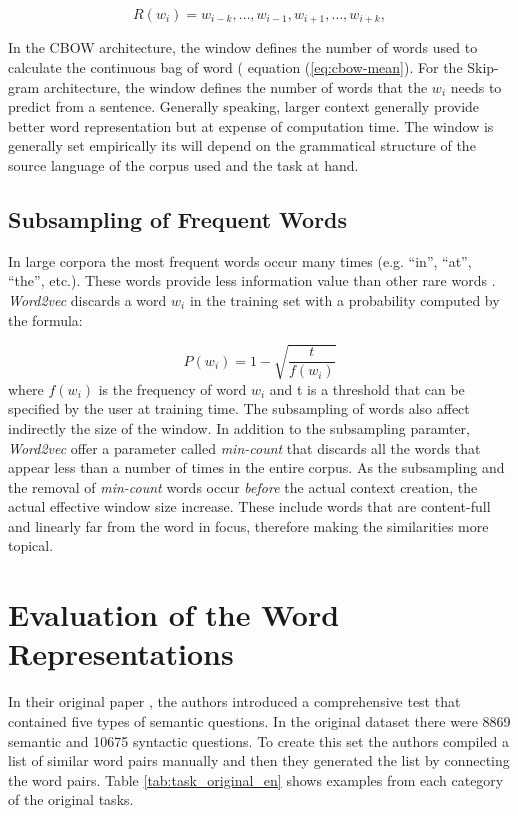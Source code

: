 \begin{equation*}
R(w_i) =
w_{i-k},\ldots,w_{i-1},w_{i+1},\ldots,w_{i+k},
\end{equation*}

In  the \ac{CBOW} architecture, the window defines the number of words used to
calculate the continuous bag of word ( equation (\ref{eq:cbow-mean}).  For
the Skip-gram architecture, the window defines  the number of words that the
$w_i$ needs to predict from a sentence.  Generally speaking,  larger
context generally provide better word representation but at expense of
computation time. The window  is generally set empirically its  will depend
on the grammatical structure of the source language of the corpus used and the task at hand.


\subsection{Subsampling of Frequent Words}
\label{sec:sub-hs}

In large corpora the most frequent words occur many times (e.g.
``in'', ``at'', ``the'', etc.). These words  provide  less information value
than other rare words  \cite{MikolovSCCD13}.  \textit{Word2vec} discards a
word $w_i$ in the training set with a probability computed by the formula:

\begin{equation}
  \label{eq:w2v-subsampling}
  P(w_i)= 1 - \sqrt{\frac{t}{f(w_i)}}
\end{equation}
where $f(w_i)$  is the frequency of word $w_i$ and t is a threshold that can
be specified  by the user at training time. The subsampling of words also
affect indirectly the size of the window. In addition to the subsampling
paramter, \textit{Word2vec} offer a parameter called 
\textit{min-count} that discards all the words that appear less than a
number of times in the entire corpus.   As the subsampling and the removal of
\textit{min-count} words occur  \emph{before} the actual context creation,
the actual effective window size increase. These include words that are
content-full and linearly far from the word in focus, therefore making the similarities more topical.


\section{Evaluation of the Word Representations}
\label{sec:w2v-evaluation-word-repr}

In their original paper \cite{DBLP:journals/corr/abs-1301-3781}, the authors
introduced a comprehensive test that contained five types of semantic
questions. In the original dataset  there were 8869 semantic and 10675
syntactic questions. To create this set the authors compiled a list of
similar word pairs manually and then they generated the list by
connecting the word pairs. Table \ref{tab:task_original_en} shows  
examples from each category of the original tasks. 

